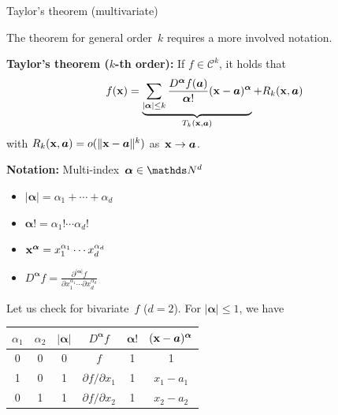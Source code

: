 \documentclass[11pt,compress,t,notes=noshow, xcolor=table]{beamer}
\begin{document}
\begin{vbframe}{Taylor's theorem (multivariate)}

The theorem for general order~$k$ requires a more involved notation.


    \textbf{Taylor's theorem ($k$-th order):} If $f \in \mathcal{C}^k$, it holds that
    \begin{equation*}
        f(\mathbf{x}) = \underbrace{\sum_{|\bm{\alpha}| \le k} \frac{D^{\bm{\alpha}} f(\bm{a})}{{\bm{\alpha}}!} (\mathbf{x} - \bm{a})^{\bm{\alpha}}}_{T_k(\mathbf{x}, \bm{a})} + R_k(\mathbf{x}, \bm{a})
    \end{equation*}
    with $R_k(\mathbf{x}, \bm{a}) = {o}(\|\mathbf{x}-\bm{a}\|^k)$ as~$\mathbf{x} \to \bm{a}$.


\textbf{Notation:} Multi-index~$\bm{\alpha} \in \N^d$

\begin{minipage}[t]{0.49\linewidth}
    \begin{itemize}
        \item $|\bm{\alpha}| = \alpha_1 + \cdots + \alpha_d$
        \item $\bm{\alpha}! = \alpha_1! \cdots \alpha_d!$
    \end{itemize}
\end{minipage}
\begin{minipage}[t]{0.49\linewidth}
    \begin{itemize}
        \item $\mathbf{x}^{\bm{\alpha}} = x_1^{\alpha_1} \cdots x_d^{\alpha_d}$
        \item $D^{\bm{\alpha}} f = \frac{\partial^{|\bm{\alpha}|} f}{\partial x_1^{\alpha_1} \cdots \partial x_d^{\alpha_d}}$
    \end{itemize}
\end{minipage}

\framebreak

Let us check for bivariate~$f$ ($d=2$).
For $|\bm{\alpha}| \le 1$, we have

\begin{table}
    \centering
    \begin{tabular}{c|c||c|c|c|c}
        $\alpha_1$ & $\alpha_2$ & $|\bm{\alpha}|$ & $D^{\bm{\alpha}} f$ & $\bm{\alpha}!$ & $(\mathbf{x}-\bm{a})^{\bm{\alpha}}$ \\ \hline\hline
        0 & 0 & 0 & $f$                         & 1 & 1          \\ \hline
        1 & 0 & 1 & $\partial f / \partial x_1$ & 1 & $x_1-a_1$  \\ \hline
        0 & 1 & 1 & $\partial f / \partial x_2$ & 1 & $x_2-a_2$
    \end{tabular}
\end{table}


\end{vbframe}
\end{document}

